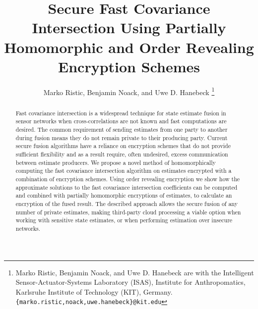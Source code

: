 \documentclass[letterpaper, 10 pt, conference]{ieeeconf}  %
\title{\LARGE \bf
Secure Fast Covariance Intersection Using Partially Homomorphic and Order Revealing Encryption Schemes
}
\author{Marko Ristic, Benjamin Noack, and Uwe D. Hanebeck%
\thanks{Marko Ristic, Benjamin Noack, and Uwe D. Hanebeck are with the Intelligent Sensor-Actuator-Systems Laboratory (ISAS), Institute for Anthropomatics, Karlsruhe Institute of Technology (KIT), Germany.\newline
{\tt\small \{marko.ristic,noack,uwe.hanebeck\}@kit.edu}%
}%
}
\begin{document}
\maketitle
\thispagestyle{empty}
\pagestyle{empty}




\begin{abstract}

Fast covariance intersection is a widespread technique for state estimate fusion in sensor networks when cross-correlations are not known and fast computations are desired. The common requirement of sending estimates from one party to another during fusion means they do not remain private to their producing party. Current secure fusion algorithms have a reliance on encryption schemes that do not provide sufficient flexibility and as a result require, often undesired, excess communication between estimate producers. We propose a novel method of homomorphically computing the fast covariance intersection algorithm on estimates encrypted with a combination of encryption schemes. Using order revealing encryption we show how the approximate solutions to the fast covariance intersection coefficients can be computed and combined with partially homomorphic encryptions of estimates, to calculate an encryption of the fused result. The described approach allows the secure fusion of any number of private estimates, making third-party cloud processing a viable option when working with sensitive state estimates, or when performing estimation over insecure networks.

\end{abstract}



\end{document}
